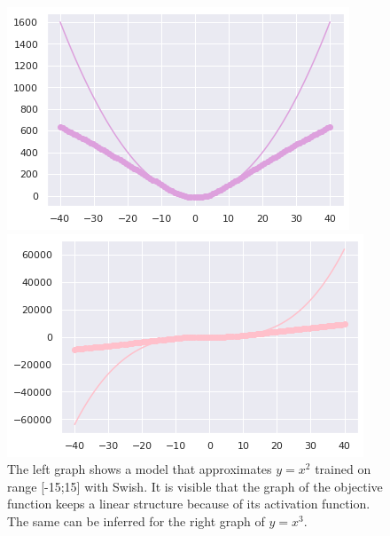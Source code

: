 \documentclass{article}
\begin{document}
\begin{figure}[H]
\begin{multicols}{2}
    \includegraphics[width=\linewidth]{swish2.png}\par
    \includegraphics[width=\linewidth]{swish3.png}\par
\end{multicols}
\caption{The left graph shows a model that approximates $y = x^2$ trained on range [-15;15] with Swish. It is visible that the graph of the objective function keeps a linear structure because of its activation function. The same can be inferred for the right graph of $y=x^3$.}
\end{figure}
\end{document}
